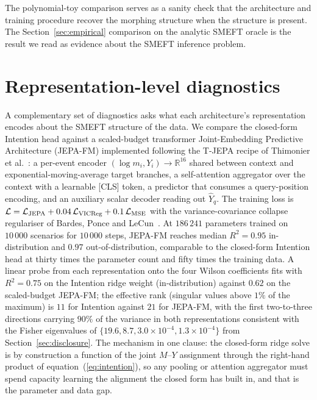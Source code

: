 \documentclass[11pt,a4paper]{article}
\begin{document}
The polynomial-toy comparison serves as a sanity check that the architecture and training procedure recover the morphing structure when the structure is present. The Section~\ref{sec:empirical} comparison on the analytic SMEFT oracle is the result we read as evidence about the SMEFT inference problem.

\section{Representation-level diagnostics}
\label{app:representations}

A complementary set of diagnostics asks what each architecture's representation encodes about the SMEFT structure of the data. We compare the closed-form Intention head against a scaled-budget transformer Joint-Embedding Predictive Architecture (JEPA-FM) implemented following the T-JEPA recipe of Thimonier et al.~\cite{Thimonier:2025tjepa}: a per-event encoder $(\log m_i, Y_i) \to \mathbb{R}^{16}$ shared between context and exponential-moving-average target branches, a self-attention aggregator over the context with a learnable [CLS] token, a predictor that consumes a query-position encoding, and an auxiliary scalar decoder reading out $\hat{Y}_q$. The training loss is $\mathcal{L} = \mathcal{L}_{\rm JEPA} + 0.04\,\mathcal{L}_{\rm VICReg} + 0.1\,\mathcal{L}_{\rm MSE}$ with the variance-covariance collapse regulariser of Bardes, Ponce and LeCun~\cite{Bardes:2022vicreg}. At $186\,241$ parameters trained on $10\,000$ scenarios for $10\,000$ steps, JEPA-FM reaches median $R^2 = 0.95$ in-distribution and $0.97$ out-of-distribution, comparable to the closed-form Intention head at thirty times the parameter count and fifty times the training data. A linear probe from each representation onto the four Wilson coefficients fits with $R^2 = 0.75$ on the Intention ridge weight (in-distribution) against $0.62$ on the scaled-budget JEPA-FM; the effective rank (singular values above $1\%$ of the maximum) is $11$ for Intention against $21$ for JEPA-FM, with the first two-to-three directions carrying $90\%$ of the variance in both representations consistent with the Fisher eigenvalues of $\{19.6, 8.7, 3.0 \times 10^{-4}, 1.3 \times 10^{-4}\}$ from Section~\ref{sec:disclosure}. The mechanism in one clause: the closed-form ridge solve is by construction a function of the joint $M$--$Y$ assignment through the right-hand product of equation~(\ref{eq:intention}), so any pooling or attention aggregator must spend capacity learning the alignment the closed form has built in, and that is the parameter and data gap.
\end{document}
